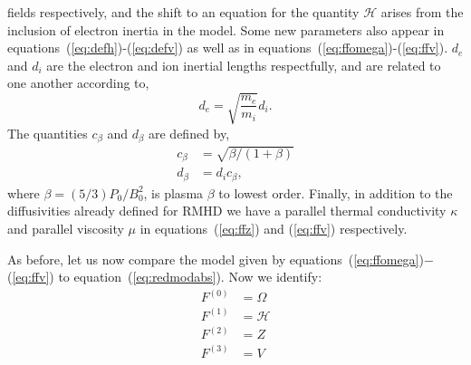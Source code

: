 \documentclass[12pt]{memoir}
\newcommand{\hfield}{\mathscr{H}}
\begin{document}
fields respectively, and the shift to an equation for the
quantity $\hfield$ arises from the inclusion of electron inertia
in the model. Some new parameters also appear in
equations~(\ref{eq:defh})-(\ref{eq:defv}) as well as in
equations~(\ref{eq:ffomega})-(\ref{eq:ffv}). $d_e$  and
$d_i$ are the electron and ion inertial lengths
respectfully, and are related to one another according to,
%
\begin{equation}
  d_e=\sqrt{\frac{m_e}{m_i}} d_i.
\end{equation}
%
The quantities $c_\beta$ and $d_\beta$ are defined by,
%
\begin{subequations}
  \begin{align}
    c_\beta &= \sqrt{\beta/(1+\beta)} \label{eq:defcbeta} \\
    d_\beta &= d_i c_\beta,           \label{eq:defdbeta}
  \end{align}
\end{subequations}
%
where $\beta=(5/3)P_0/B_0^2$, is plasma $\beta$ to lowest order.
Finally, in addition to the diffusivities already defined for RMHD
we have a parallel thermal conductivity $\kappa$ and parallel
viscosity $\mu$ in equations~(\ref{eq:ffz}) and (\ref{eq:ffv})
respectively.
%
\par
%
As before, let us now compare the model given by 
equations~(\ref{eq:ffomega})$-$(\ref{eq:ffv}) to 
equation~(\ref{eq:redmodabs}). Now we identify:
%
\begin{subequations}
\begin{align}
  F^{(0)}                        &= \Omega                                                                             \label{eq:ffzero} \\
  F^{(1)}                        &=  \hfield                                                                           \label{eq:ffone}  \\
  F^{(2)}                        &=  Z                                                                                 \label{eq:fftwo}  \\
  F^{(3)}                        &=  V                                                                                 \label{eq:ffthree}
\end{align}
\end{subequations}
%
\end{document}
